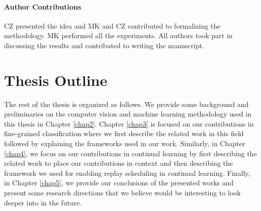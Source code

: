 \paragraph{Author Contributions} 
CZ presented the idea and MK and CZ contributed to formalizing the methodology. 
MK performed all the experiments. 
All authors took part in discussing the results and contributed to writing the manuscript. 



\section{Thesis Outline}\label{sec:outline}
The rest of the thesis is organized as follows. We provide some background and preliminaries on the computer vision and machine learning methodology used in this thesis in Chapter \ref{chap2}. Chapter \ref{chap3} is focused on our contributions in fine-grained classification where we first describe the related work in this field followed by explaining the frameworks used in our work. Similarly, in Chapter \ref{chap4}, we focus on our contributions in continual learning by first describing the related work to place our contributions in context and then describing the framework we used for enabling replay scheduling in continual learning. Finally, in Chapter \ref{chap5}, we provide our conclusions of the presented works and present some research directions that we believe would be interesting to look deeper into in the future. 
